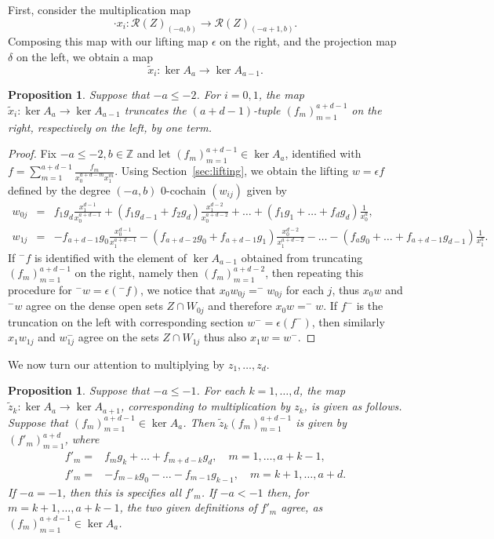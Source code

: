 \documentclass[a4paper,11pt]{amsart}
\theoremstyle{plain}
\newtheorem{proposition}[theorem]{Proposition}
\theoremstyle{definition}
\newcommand{\R}{\mathcal{R}}
\newcommand{\Z}{\mathbb{Z}}
\begin{document}
First, consider the multiplication map
\[ \cdot x_i \colon \R(Z)_{(-a,b)} \to \R(Z)_{(-a+1,b)}. 
\]
Composing this map with our lifting map $\epsilon$ on the right, and the projection map $\delta$ on the left, we obtain a map
\[\tilde x_i : \ker A_{a} \rightarrow \ker A_{a-1}.\]
\begin{proposition}
    Suppose that $-a \leqslant -2$. For $i=0,1$, the map $\tilde x_i : \ker A_{a} \rightarrow \ker A_{a-1}$ truncates the $(a+d-1)$-tuple $(f_m)_{m=1}^{a+d-1}$ on the right, respectively on the left, by one term.
    \label{xmult}
\end{proposition}
\begin{proof}
Fix $-a \leqslant -2, b \in \Z$ and let $(f_m)_{m=1}^{a+d-1} \in \ker A_a$,
identified with $f = \sum_{m=1}^{a+d-1} \frac{f_m}{x_0^{a+d-m} x_1^m}$.
Using Section~\ref{sec:lifting}, we obtain the lifting $w=\epsilon f$ defined by the degree $(-a,b)$ $0$-cochain $(w_{ij})$ given by
\begin{eqnarray*}
w_{0j} & = & f_1 g_d \frac{x_1^{d-1}}{x_0^{a+d-1}} + (f_1 g_{d-1} + f_2 g_d)\frac{x_1^{d-2}}{x_0^{a+d-2}} + \dots + (f_1 g_1 + \dots + f_d g_d) \frac{1}{x_0^a}, \\
w_{1j} & =  &  -f_{a+d-1} g_0 \frac{x_0^{d-1}}{x_1^{a+d-1}} - (f_{a+d-2} g_{0} + f_{a+d-1} g_1)\frac{x_0^{d-2}}{x_1^{a+d-2}} - \dots - (f_a g_0 + \dots + f_{a+d-1} g_{d-1}) \frac{1}{x_1^a}.
\end{eqnarray*}
If $^-f$ is identified with the element of $\ker A_{a-1}$ obtained from truncating $(f_m)_{m=1}^{a+d-1}$ on the right, namely then $(f_m)_{m=1}^{a+d-2}$, then repeating this procedure for $^-w = \epsilon (^-f)$, we notice that $x_0 w_{0j} = ^-w_{0j}$ for each $j$, thus $x_0 w$ and $^-w$ agree on the dense open sets $Z \cap W_{0j}$ and therefore $x_0 w = ^-w$. If $f^-$ is the truncation on the left with corresponding section $w^- = \epsilon (f^-)$, then similarly $x_1 w_{1j}$ and $w^-_{1j}$ agree on the sets $Z \cap W_{1j}$ thus also $x_1 w = w^-$. 
\end{proof}

We now turn our attention to multiplying by $z_1, \dots, z_d$. 

\begin{proposition}
    Suppose that $-a \leqslant -1$. For each $k = 1,\dots,d$, the map $\tilde z_k : \ker A_{a} \rightarrow \ker A_{a+1}$, corresponding to multiplication by $z_k$, is given as follows. Suppose that $(f_m)_{m=1}^{a+d-1} \in \ker A_a$. Then $\tilde z_k (f_m)_{m=1}^{a+d-1}$ is given by $(f'_m)_{m=1}^{a+d}$, where
    \begin{align*}
        f'_m =& f_m g_k + \dots + f_{m+d-k} g_d, \quad m = 1,\dots,a+k-1, \\
        f'_m =& -f_{m-k} g_0 - \dots - f_{m-1} g_{k-1}, \quad m = k+1,\dots, a+d.
    \end{align*}
    If $-a = -1$, then this is specifies all $f'_m$. If $-a < -1$ then, for $m = k+1, \dots, a+k-1$, the two given definitions of $f'_m$ agree, as $(f_m)_{m=1}^{a+d-1} \in \ker A_a$.
    \label{zmult}
\end{proposition}
\end{document}
